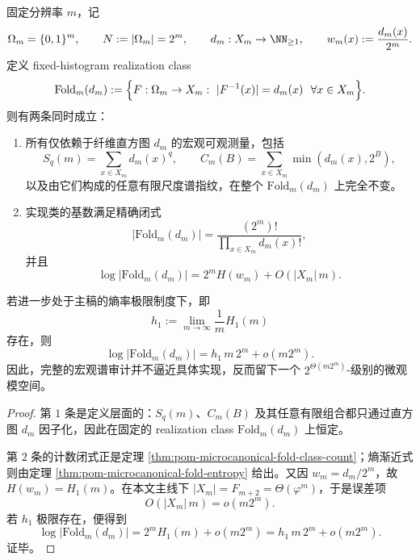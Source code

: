 \begin{theorem}[宏观谱完备与实现模空间不透明性]\label{thm:conclusion-oracle-macrospectrum-complete-implementation-opaque}
固定分辨率 \(m\)，记
\[
\Omega_m=\{0,1\}^m,
\qquad
N:=|\Omega_m|=2^m,
\qquad
d_m:X_m\to\NN_{\ge1},
\qquad
w_m(x):=\frac{d_m(x)}{2^m}.
\]
定义 fixed-histogram realization class
\[
\mathrm{Fold}_m(d_m):=
\Bigl\{
F:\Omega_m\to X_m:\ |F^{-1}(x)|=d_m(x)\ \ \forall x\in X_m
\Bigr\}.
\]
则有两条同时成立：
\begin{enumerate}
  \item 所有仅依赖于纤维直方图 \(d_m\) 的宏观可观测量，包括
  \[
  S_q(m)=\sum_{x\in X_m}d_m(x)^q,
  \qquad
  C_m(B)=\sum_{x\in X_m}\min(d_m(x),2^B),
  \]
  以及由它们构成的任意有限尺度谱指纹，在整个 \(\mathrm{Fold}_m(d_m)\) 上完全不变。

  \item 实现类的基数满足精确闭式
  \[
  |\mathrm{Fold}_m(d_m)|=\frac{(2^m)!}{\prod_{x\in X_m}d_m(x)!},
  \]
  并且
  \[
  \log |\mathrm{Fold}_m(d_m)|
  =
  2^m H(w_m)+O(|X_m|\,m).
  \]
\end{enumerate}
若进一步处于主稿的熵率极限制度下，即
\[
h_1:=\lim_{m\to\infty}\frac1m H_1(m)
\]
存在，则
\[
\log |\mathrm{Fold}_m(d_m)|=h_1\,m\,2^m+o(m2^m).
\]
因此，完整的宏观谱审计并不逼近具体实现，反而留下一个 \(2^{\Theta(m2^m)}\)-级别的微观模空间。
\end{theorem}
\begin{proof}
第 \(1\) 条是定义层面的：\(S_q(m)\)、\(C_m(B)\) 及其任意有限组合都只通过直方图 \(d_m\) 因子化，因此在固定的 realization class \(\mathrm{Fold}_m(d_m)\) 上恒定。

第 \(2\) 条的计数闭式正是定理 \ref{thm:pom-microcanonical-fold-class-count}；熵渐近式则由定理 \ref{thm:pom-microcanonical-fold-entropy} 给出。又因 \(w_m=d_m/2^m\)，故 \(H(w_m)=H_1(m)\)。在本文主线下 \(|X_m|=F_{m+2}=\Theta(\varphi^m)\)，于是误差项
\[
O(|X_m|\,m)=o(m2^m).
\]
若 \(h_1\) 极限存在，便得到
\[
\log |\mathrm{Fold}_m(d_m)|
=
2^mH_1(m)+o(m2^m)
=
h_1\,m\,2^m+o(m2^m).
\]
证毕。
\end{proof}

